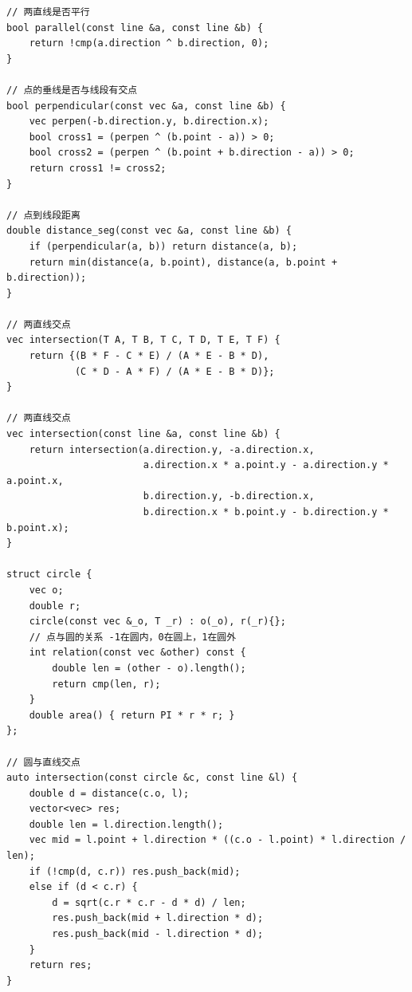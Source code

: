\documentclass[UTF8]{ctexart}
\begin{document}
\begin{sloppypar}
\begin{lstlisting}[style=cpp]
// 两直线是否平行
bool parallel(const line &a, const line &b) {
    return !cmp(a.direction ^ b.direction, 0);
}

// 点的垂线是否与线段有交点
bool perpendicular(const vec &a, const line &b) {
    vec perpen(-b.direction.y, b.direction.x);
    bool cross1 = (perpen ^ (b.point - a)) > 0;
    bool cross2 = (perpen ^ (b.point + b.direction - a)) > 0;
    return cross1 != cross2;
}

// 点到线段距离
double distance_seg(const vec &a, const line &b) {
    if (perpendicular(a, b)) return distance(a, b);
    return min(distance(a, b.point), distance(a, b.point + b.direction));
}

// 两直线交点
vec intersection(T A, T B, T C, T D, T E, T F) {
    return {(B * F - C * E) / (A * E - B * D),
            (C * D - A * F) / (A * E - B * D)};
}

// 两直线交点
vec intersection(const line &a, const line &b) {
    return intersection(a.direction.y, -a.direction.x,
                        a.direction.x * a.point.y - a.direction.y * a.point.x,
                        b.direction.y, -b.direction.x,
                        b.direction.x * b.point.y - b.direction.y * b.point.x);
}

struct circle {
    vec o;
    double r;
    circle(const vec &_o, T _r) : o(_o), r(_r){};
    // 点与圆的关系 -1在圆内，0在圆上，1在圆外
    int relation(const vec &other) const {
        double len = (other - o).length();
        return cmp(len, r);
    }
    double area() { return PI * r * r; }
};

// 圆与直线交点
auto intersection(const circle &c, const line &l) {
    double d = distance(c.o, l);
    vector<vec> res;
    double len = l.direction.length();
    vec mid = l.point + l.direction * ((c.o - l.point) * l.direction / len);
    if (!cmp(d, c.r)) res.push_back(mid);
    else if (d < c.r) {
        d = sqrt(c.r * c.r - d * d) / len;
        res.push_back(mid + l.direction * d);
        res.push_back(mid - l.direction * d);
    }
    return res;
}


\end{lstlisting}
\end{sloppypar}
\end{document}
